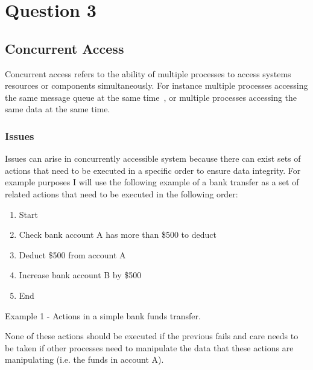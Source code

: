 \documentclass[a4paper,12pt]{article}
\newenvironment{boxit}{\begin{lrbox}{\savepar}
        \begin{minipage}[b]{4.6in}}
        {\end{minipage}\end{lrbox}\fbox{\usebox{\savepar}}}
\begin{document}
\section*{Question 3}

\subsection*{Concurrent Access}
Concurrent access refers to the ability of multiple processes to access systems resources or components simultaneously. 
For instance multiple processes accessing the same message queue at the same time~\citep{managing-concurrent-access}, or multiple processes accessing the same data at the same time.
\subsubsection*{Issues}
Issues can arise in concurrently accessible system because there can exist sets of actions that need to be executed in a specific order to ensure data integrity.
For example purposes I will use the following example of a bank transfer as a set of related actions that need to be executed in the following order:

\begin{center}
    \begin{boxit}
        \begin{center}
               \begin{enumerate}
                    \item{Start}
                    \item{Check bank account A has more than \$500 to deduct}
                    \item{Deduct \$500 from account A}
                    \item{Increase bank account B by \$500}
                    \item{End}
                \end{enumerate}
        \end{center}
    \end{boxit}
\end{center}
\begin{center}
    Example 1 - Actions in a simple bank funds transfer.
\end{center}
None of these actions should be executed if the previous fails and care needs to be taken if other processes need to manipulate the data that these actions are manipulating (i.e. the funds in account A).
\end{document}
